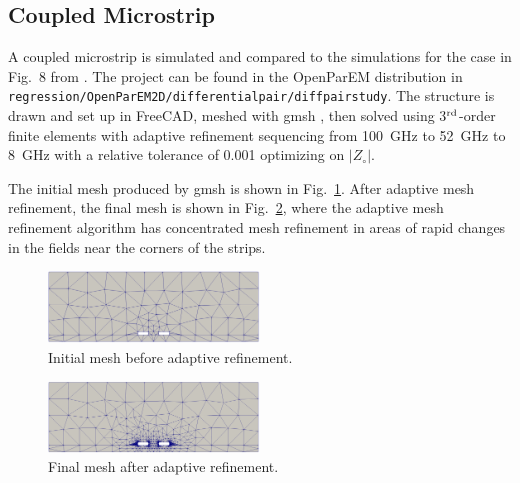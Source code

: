 \documentclass[titlepage]{article}
\renewcommand\_{\textunderscore\linebreak[1]}
\begin{document}
\subsection{Coupled Microstrip}

A coupled microstrip is simulated and compared to the simulations for the case in Fig.~8 from \cite{Olyslager}.  The project can be found in the OpenParEM distribution in \texttt{regression/OpenParEM2D/differential\_pair/diff\_pair\_study}.  The structure is drawn and set up in FreeCAD, meshed with gmsh \cite{gmsh}\cite{gmshweb}, then solved using 3$^{\textnormal{rd}}$-order finite elements with adaptive refinement sequencing from 100~GHz to 52~GHz to 8~GHz with a relative tolerance of 0.001 optimizing on $|Z_{\circ}|$.

The initial mesh produced by gmsh is shown in Fig.~\ref{fig:diffpair_initial_mesh}.  After adaptive mesh refinement, the final mesh is shown in Fig.~\ref{fig:diffpair_optimized_mesh}, where the adaptive mesh refinement algorithm has concentrated mesh refinement in areas of rapid changes in the fields near the corners of the strips.
\begin{figure}[H]
  \centering
  \includegraphics[width=0.5\textwidth]{../regression/OpenParEM2D/differential_pair/diff_pair_study/screenshots/diffpair_initial_mesh}
  \caption{Initial mesh before adaptive refinement.}
  \label{fig:diffpair_initial_mesh}
\end{figure}
\begin{figure}[H]
  \centering
  \includegraphics[width=0.5\textwidth]{../regression/OpenParEM2D/differential_pair/diff_pair_study/screenshots/diffpair_optimized_mesh}
  \caption{Final mesh after adaptive refinement.}
  \label{fig:diffpair_optimized_mesh}
\end{figure}
\end{document}
